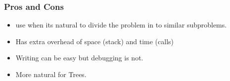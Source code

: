 \begin{frame}[fragile]
	\frametitle{Pros and Cons}
		\begin{itemize}
			\item use when its natural to divide the problem in to similar subproblems.
			\item Has extra overhead of space (stack) and time (calls)
			\item Writing can be easy but debugging is not.
			\item More natural for Trees.
		\end{itemize}
\end{frame}

